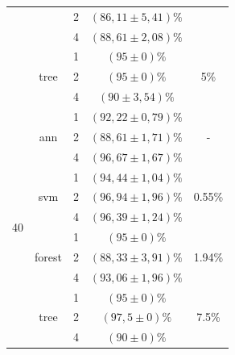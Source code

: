 \begin{table}[]
\begin{tabular}{|c|c|c|c|c|}
                      &                         & 2                & $ (86,11 \pm 5,41) \% $   &\\ \cline{3-4} 
                      &                         & 4                & $ (88,61 \pm 2,08) \% $  & \\ \cline{2-5} 
                      & \multirow{3}{*}{tree}   & 1                & $ (95 \pm 0) \%  $       & \multirow{3}{*}{5\%} \\ \cline{3-4} 
                      &                         & 2                & $ (95 \pm 0) \%  $       &\\ \cline{3-4} 
                      &                         & 4                & $ (90 \pm  3,54) \% $     & \\ \hline
\multirow{12}{*}{40}  & \multirow{3}{*}{ann}    & 1                & $ (92,22 \pm 0,79) \% $   & \multirow{3}{*}{-} \\ \cline{3-4} 
                      &                         & 2                & $ (88,61 \pm 1,71) \% $   &\\ \cline{3-4} 
                      &                         & 4                & $ (96,67 \pm 1,67) \% $  & \\ \cline{2-5} 
                      & \multirow{3}{*}{svm}    & 1                & $ (94,44 \pm 1,04) \% $   & \multirow{3}{*}{0.55\%} \\ \cline{3-4} 
                      &                         & 2                & $ (96,94 \pm 1,96) \% $  & \\ \cline{3-4} 
                      &                         & 4                & $ (96,39 \pm 1,24) \% $   &\\ \cline{2-5} 
                      & \multirow{3}{*}{forest} & 1                & $ (95 \pm 0) \% $        & \multirow{3}{*}{1.94\%} \\ \cline{3-4} 
                      &                         & 2                & $ (88,33 \pm 3,91) \% $   &\\ \cline{3-4} 
                      &                         & 4                & $ (93,06 \pm 1,96) \% $   &\\ \cline{2-5} 
                      & \multirow{3}{*}{tree}   & 1                & $ (95 \pm 0) \% $         & \multirow{3}{*}{7.5\%} \\ \cline{3-4} 
                      &                         & 2                & $ (97,5 \pm 0) \% $      &\\ \cline{3-4} 
                      &                         & 4                & $ (90 \pm 0) \%   $     & \\ \hline

\end{tabular}
\end{table}
